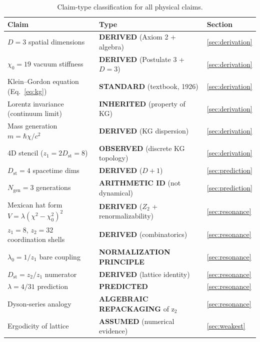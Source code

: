 \documentclass[12pt,a4paper]{article}
\newcommand{\chizero}{\chi_0}
\newcommand{\Dst}{D_{\mathrm{st}}}
\newcommand{\Ngen}{N_{\mathrm{gen}}}
\begin{document}
\begin{table}[h]
\centering\small
\begin{tabular}{lll}
\toprule
Claim & Type & Section \\
\midrule
$D = 3$ spatial dimensions & \textbf{DERIVED} (Axiom 2 + algebra) & \ref{sec:derivation} \\
$\chizero = 19$ vacuum stiffness & \textbf{DERIVED} (Postulate 3 + $D=3$) & \ref{sec:derivation} \\
Klein--Gordon equation (Eq.~\ref{eq:kg}) & \textbf{STANDARD} (textbook, 1926) & \ref{sec:derivation} \\
Lorentz invariance (continuum limit) & \textbf{INHERITED} (property of KG) & \ref{sec:derivation} \\
Mass generation $m = \hbar\chi/c^2$ & \textbf{DERIVED} (KG dispersion) & \ref{sec:derivation} \\
4D stencil ($z_1 = 2\Dst = 8$) & \textbf{OBSERVED} (discrete KG topology) & \ref{sec:derivation} \\
$\Dst = 4$ spacetime dims & \textbf{DERIVED} ($D + 1$) & \ref{sec:prediction} \\
$\Ngen = 3$ generations & \textbf{ARITHMETIC ID} (not dynamical) & \ref{sec:prediction} \\
Mexican hat form $V = \lambda(\chi^2\!-\!\chizero^2)^2$ & \textbf{DERIVED} ($Z_2$ + renormalizability) & \ref{sec:resonance} \\
$z_1 = 8$, $z_2 = 32$ coordination shells & \textbf{DERIVED} (combinatorics) & \ref{sec:resonance} \\
$\lambda_0 = 1/z_1$ bare coupling & \textbf{NORMALIZATION PRINCIPLE} & \ref{sec:resonance} \\
$\Dst = z_2/z_1$ numerator & \textbf{DERIVED} (lattice identity) & \ref{sec:resonance} \\
$\lambda = 4/31$ prediction & \textbf{PREDICTED} & \ref{sec:resonance} \\
Dyson-series analogy & \textbf{ALGEBRAIC REPACKAGING} of z$_2$ & \ref{sec:resonance} \\
Ergodicity of lattice & \textbf{ASSUMED} (numerical evidence) & \ref{sec:weakest} \\
\bottomrule
\end{tabular}
\caption{Claim-type classification for all physical claims.}
\label{tab:claims}
\end{table}
\end{document}
